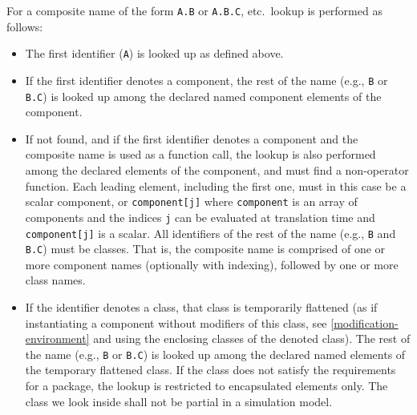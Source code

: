 For a composite name of the form \lstinline!A.B! or \lstinline!A.B.C!, etc.\ lookup is performed as follows:
\begin{itemize}
\item
  The first identifier (\lstinline!A!) is looked up as defined above.
\item
  If the first identifier denotes a component, the rest of the name (e.g., \lstinline!B! or \lstinline!B.C!) is looked up among the declared named component elements of the component.
\item
  If not found, and if the first identifier denotes a component and the composite name is used as a function call, the lookup is also performed among the declared elements of the component, and must find a non-operator function.
  Each leading element, including the first one, must in this case be a scalar component, or \lstinline!component[j]! where \lstinline!component! is an array of components and the indices \lstinline!j! can be evaluated at translation time and \lstinline!component[j]! is a scalar.
  All identifiers of the rest of the name (e.g., \lstinline!B! and \lstinline!B.C!) must be classes.
  That is, the composite name is comprised of one or more component names (optionally with indexing), followed by one or more class names.
\item
  If the identifier denotes a class, that class is temporarily flattened (as if instantiating a component without modifiers of this class, see \cref{modification-environment} and using the enclosing classes of the denoted class).
  The rest of the name (e.g., \lstinline!B! or \lstinline!B.C!) is looked up among the declared named elements of the temporary flattened class.
  If the class does not satisfy the requirements for a package, the lookup is restricted to encapsulated elements only.
  The class we look inside shall not be partial in a simulation model.
\end{itemize}

